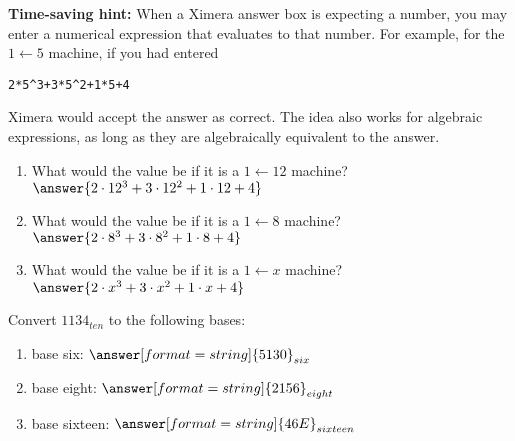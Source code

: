 \documentclass[nooutcomes]{ximera}
\begin{document}
\begin{problem}
\begin{problem}
\textbf{Time-saving hint:}  When a Ximera answer box is expecting a number, you may enter a numerical expression that evaluates to that number.  
For example, for the $1\leftarrow 5$ machine, if you had entered 
\begin{verbatim}
2*5^3+3*5^2+1*5+4
\end{verbatim}
Ximera would accept the answer as correct.  The idea also works for algebraic expressions, as long as they are algebraically equivalent to the answer.  
\begin{enumerate}
\item What would the value be if it is a $1\leftarrow 12$ machine? $\answer{2\cdot 12^3+3\cdot 12^2+1\cdot 12+4}$
\item What would the value be if it is a $1\leftarrow 8$ machine? $\answer{2\cdot 8^3+3\cdot 8^2+1\cdot 8+4}$
\item What would the value be if it is a $1\leftarrow x$ machine? $\answer{2\cdot x^3+3\cdot x^2+1\cdot x+4}$
\end{enumerate}
\end{problem}

\end{problem}

\begin{problem}
Convert $1134_{ten}$ to the following bases: 
\begin{enumerate}
\item base six: $\answer[format=string]{5130}_{six}$
\item base eight: $\answer[format=string]{2156}_{eight}$
\item base sixteen: $\answer[format=string]{46E}_{sixteen}$
\end{enumerate}
\end{problem}
\end{document}
